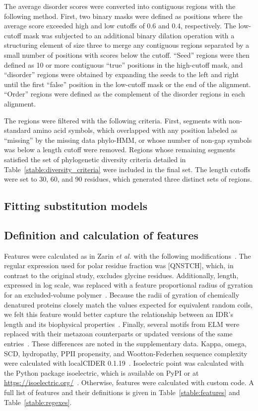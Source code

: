 The average disorder scores were converted into contiguous regions with the following method. First, two binary masks were defined as positions where the average score exceeded high and low cutoffs of 0.6 and 0.4, respectively. The low-cutoff mask was subjected to an additional binary dilation operation with a structuring element of size three to merge any contiguous regions separated by a small number of positions with scores below the cutoff. ``Seed'' regions were then defined as 10 or more contiguous ``true'' positions in the high-cutoff mask, and ``disorder'' regions were obtained by expanding the seeds to the left and right until the first ``false'' position in the low-cutoff mask or the end of the alignment. ``Order'' regions were defined as the complement of the disorder regions in each alignment.

The regions were filtered with the following criteria. First, segments with non-standard amino acid symbols, which overlapped with any position labeled as ``missing'' by the missing data phylo-HMM, or whose number of non-gap symbols was below a length cutoff were removed. Regions whose remaining segments satisfied the set of phylogenetic diversity criteria detailed in Table~\ref{stable:diversity_criteria} were included in the final set. The length cutoffs were set to 30, 60, and 90 residues, which generated three distinct sets of regions.

\subsection{Fitting substitution models}

\subsection{Definition and calculation of features}
Features were calculated as in Zarin \textit{et al.} with the following modifications~\cite{Zarin2019}. The regular expression used for polar residue fraction was [QNSTCH], which, in contrast to the original study, excludes glycine residues. Additionally, length, expressed in log scale, was replaced with a feature proportional radius of gyration for an excluded-volume polymer~\cite{Flory1949}. Because the radii of gyration of chemically denatured proteins closely match the values expected for equivalent random coils, we felt this feature would better capture the relationship between an IDR's length and its biophysical properties~\cite{Kohn2004}. Finally, several motifs from ELM were replaced with their metazoan counterparts or updated versions of the same entries~\cite{Kumar2021}. These differences are noted in the supplementary data. Kappa, omega, SCD, hydropathy, PPII propensity, and Wootton-Federhen sequence complexity were calculated with localCIDER 0.1.19~\cite{Holehouse2017}. Isoelectric point was calculated with the Python package isoelectric, which is available on PyPI or at \url{https://isoelectric.org/}~\cite{Kozlowski2016}. Otherwise, features were calculated with custom code. A full list of features and their definitions is given in Table~\ref{stable:features} and Table~\ref{stable:regexes}.

